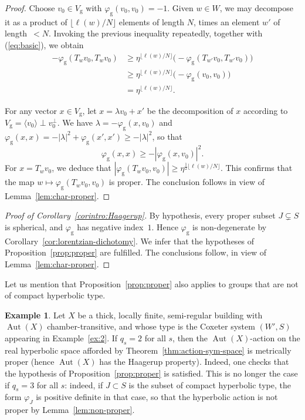 \documentclass[12pt,a4paper]{amsproc}
\theoremstyle{definition}
\newtheorem{example}[theorem]{Example}
\DeclareMathOperator{\Aut}{Aut}
\newcommand{\rg}{\mathrm g}
\begin{document}
\begin{proof}
Choose $v_0 \in V_\rg$ with $\varphi_\rg(v_0, v_0) = -1$. Given $w \in W$, we may decompose it   as a product of $\lfloor\ell(w)/N\rfloor$ elements of length $N$, times an element $w'$ of length~$<N$.  Invoking the previous inequality repeatedly, together with (\ref{eq:basic}), 
we obtain
\begin{align*}
-\varphi_\rg(T_wv_0,T_wv_0)
& \geq
\eta^{\lfloor\ell(w)/N\rfloor}\bigl(-\varphi_\rg(T_{w'}v_0, T_{w'}v_0)\bigr) \\
&\geq \eta^{\lfloor\ell(w)/N\rfloor}\bigl(-\varphi_\rg(v_0, v_0)\bigr) \\
&=  \eta^{\lfloor\ell(w)/N\rfloor}.
\end{align*}



For any vector $x \in V_\rg$, let $x = \lambda v_0 + x'$ be the decomposition of $x$ according to $V_\rg = \langle v_0 \rangle \perp v_0^\perp$. We have $\lambda = -\varphi_\rg(x, v_0)$ and $\varphi_\rg(x, x) = -|\lambda|^2 + \varphi_\rg(x', x') \geq - |\lambda|^2$, so that 
$$\varphi_\rg(x, x)  \geq - |\varphi_\rg(x, v_0)|^2.$$
For $x = T_wv_0$, we deduce  that $|\varphi_\rg(T_w v_0, v_0)| \geq  \eta^{\frac 1 2 \lfloor\ell(w)/N\rfloor}$. This confirms that the map $w \mapsto \varphi_\rg(T_wv_0, v_0)$ is proper. The conclusion follows in view of Lemma~\ref{lem:char-proper}.
\end{proof}
	

		
		
\begin{proof}[Proof of Corollary~\ref{corintro:Haagerup}]
By hypothesis, every proper subset $J \subsetneq S$ is spherical, and $\varphi_\rg$ has negative index~$1$. Hence $\varphi_\rg$  is  non-degenerate by Corollary~\ref{cor:lorentzian-dichotomy}. We infer that the hypotheses of Proposition~\ref{prop:proper} are fulfilled. The conclusions follow, in view of Lemma~\ref{lem:char-proper}.
\end{proof}		

Let us  mention that Proposition~\ref{prop:proper} also applies to groups that are not of compact hyperbolic type. 

\begin{example}
Let $X$ be a thick, locally finite, semi-regular building with $\Aut(X)$ chamber-transitive, and whose  type is the Coxeter system $(W', S)$ appearing in Example~\ref{ex:2}. If $q_s =2$ for all $s$, then the $\Aut(X)$-action on the real hyperbolic space afforded by Theorem~\ref{thm:action-sym-space} is metrically proper (hence $\Aut(X)$ has the Haagerup property). Indeed,  one checks that the hypothesis of Proposition~\ref{prop:proper} is satisfied. This is no longer the case if $q_s =3$ for all $s$: indeed, if $J \subset S$ is the subset of compact hyperbolic type, the form $\varphi_J$ is positive definite in that case, so that the hyperbolic action is not proper by Lemma~\ref{lem:non-proper}.
\end{example}
	


 

\end{document}
